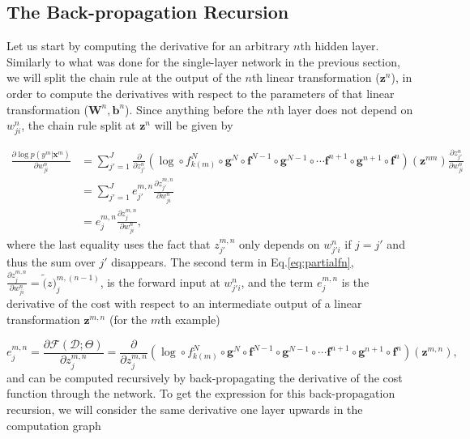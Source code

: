 \subsection{The Back-propagation Recursion}
Let us start by computing the derivative for an arbitrary $n$th hidden layer. Similarly to what was done for the single-layer network in the previous section, we will
split the chain rule at the output of the $n$th linear transformation ($\mathbf{z}^n$), in order to compute the derivatives with respect to the parameters of that linear transformation ($\mathbf{W}^n, \mathbf{b}^n$). Since anything before the $n$th layer does not depend on $w_{ji}^n$, the chain rule split at $\mathbf{z}^n$ will be given by

\begin{align}
\frac{\partial \log p(y^m | \mathbf{x}^m)}{\partial w_{ji}^n} & = \sum_{j'=1}^J \frac{\partial}{\partial z^n_{j'}} (\log \circ f_{k(m)}^N \circ \mathbf{g}^N \circ \mathbf{f}^{N-1} \circ \mathbf{g}^{N-1} \circ \cdots \mathbf{f}^{n+1} \circ \mathbf{g}^{n+1} \circ \mathbf{f}^{n})(\mathbf{z}^{nm})\frac{\partial z^n_{j'}}{\partial w_{ji}^n}\nonumber\\ & = \sum_{j'=1}^J e^{m,n}_{j'} \frac{\partial z^{m,n}_{j'}}{\partial w_{ji}^n}\nonumber\\ & = e^{m,n}_{j}\frac{\partial z^{m,n}_{j}}{\partial w_{ji}^n},
\label{eq:partialfn}
\end{align}
%
where the last equality uses the fact that $z^{m,n}_{j'}$ only depends on
$w_{j'i}^n$ if $j=j'$ and thus the sum over $j'$ disappears. The second term in Eq.\ref{eq:partialfn}, $\frac{\partial z^{m,n}_{j}}{\partial w_{ji}^n}=\tilde(z)_{j}^{m,(n-1)}$, is the forward input at $w_{j'i}^n$, and the term $e^{m,n}_j$
is the derivative of the cost with respect to an intermediate output of
a linear transformation $\mathbf{z}^{m,n}$ (for the $m$th example)

\begin{equation}
e^{m,n}_j =  \frac{\partial \mathcal{F}(\mathcal{D};\Theta)}{\partial z^{m,n}_{j}} = \frac{\partial}{\partial z^{m,n}_{j}} (\log \circ f_{k(m)}^N \circ \mathbf{g}^N \circ \mathbf{f}^{N-1} \circ \mathbf{g}^{N-1} \circ \cdots \mathbf{f}^{n+1} \circ \mathbf{g}^{n+1} \circ \mathbf{f}^{n})(\mathbf{z}^{m,n}),
\end{equation}
%
and can be computed recursively by back-propagating the derivative of the cost function through the network.
To get the expression for this back-propagation recursion, we will consider the same derivative one layer upwards in the
computation graph  

